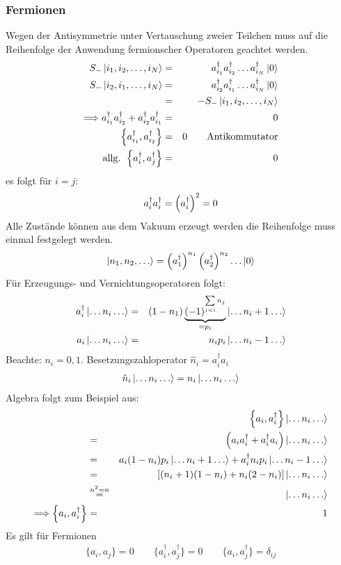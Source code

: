 \subsubsection{Fermionen}
Wegen der Antisymmetrie unter Vertauschung zweier Teilchen muss auf die Reihenfolge der Anwendung fermionscher Operatoren geachtet werden.
\begin{eqnarray*}
S_- \left | i_1,i_2,\dots,i_N\right > &=& a_{i_1}^\dagger a_{i_2}^\dagger\dots a_{i_N}^\dagger \left | 0 \right >\\
S_- \left | i_2,i_1,\dots,i_N\right > &=& a_{i_2}^\dagger a_{i_1}^\dagger\dots a_{i_N}^\dagger \left | 0 \right >\\
 &=& -S_-\left |i_1,i_2,\dots,i_N\right >\\
\Longrightarrow a_{i_1}^\dagger a_{i_2}^\dagger + a_{i_2}^\dagger a_{i_1}^\dagger &=& 0\\
\left\{a_{i_1}^\dagger,a_{i_2}^\dagger \right \} &=& 0 \qquad \text{Antikommutator}\\
\text{allg.  }\left\{a_i^\dagger,a_j^\dagger \right\} &=& 0
\end{eqnarray*}
es folgt für $i = j $: 
\begin{eqnarray*} a_i^\dagger a_i^\dagger = \left(a_i^\dagger \right )^2 = 0\end{eqnarray*}
Alle Zustände können aus dem Vakuum erzeugt werden die Reihenfolge muss einmal festgelegt werden.
\begin{eqnarray*}
\left | n_1,n_2,\dots \ro = \left(a_1 ^\dagger \ri)^{n_1} \left(a_2^\dagger \ri)^{n_2}\dots \left | 0 \ro
\end{eqnarray*}
Für Erzeugungs- und Vernichtungsoperatoren folgt:\\
\begin{eqnarray*}
a_i^\dagger \left | \dots n_i \dots \ro \g \left (1 -n_1 \ri) \underbrace{(-1)^{\sum \limits_{j<i}n_j}}_{=p_i} \left | \dots n_i+1 \dots \ro\\
a_i \left | \dots n_i \dots \ro \g n_i p_i \left | \dots n_i-1 \dots \ro
\end{eqnarray*} 
Beachte: $n_i = 0,1$.
Besetzungszahloperator  $\hat n_i = a_i^\dagger a_i$
\begin{eqnarray*} \hat n_i \left | \dots n_i \dots \ro = n_i \left | \dots n_i \dots \ro
\end{eqnarray*}
Algebra folgt zum Beispiel aus:
\begin{eqnarray*} &{}& \left \{a_i,a_i^\dagger \ri \} \left | \dots n_i \dots\ro\\
\g \left(a_ia_i^\dagger + a_i^\dagger a_i \ri) \left | \dots n_i\dots\ro\\
\g a_i(1 -n_i)p_i \left | \dots n_i+1\dots\ro + a_i^\dagger n_ip_i \left |\dots n_i-1\dots\ro\\
\g \left [(n_i+1)(1-n_i) + n_i(2-n_i)\ri] \left | \dots n_i\dots\ro\\
&\overset{n^2 = n}{=}& \left | \dots n_i \dots \ro\\
\Longrightarrow \left\{a_i,a_i^\dagger \ri \} \g 1
\end{eqnarray*}
Es gilt für Fermionen
\begin{eqnarray*}
\boxed{\{a_i,a_j\} = 0 \qquad \{a_i^\dagger,a_j^\dagger\} = 0 \qquad \{a_i,a_j^\dagger\} =\delta _{ij}}
\end{eqnarray*}
